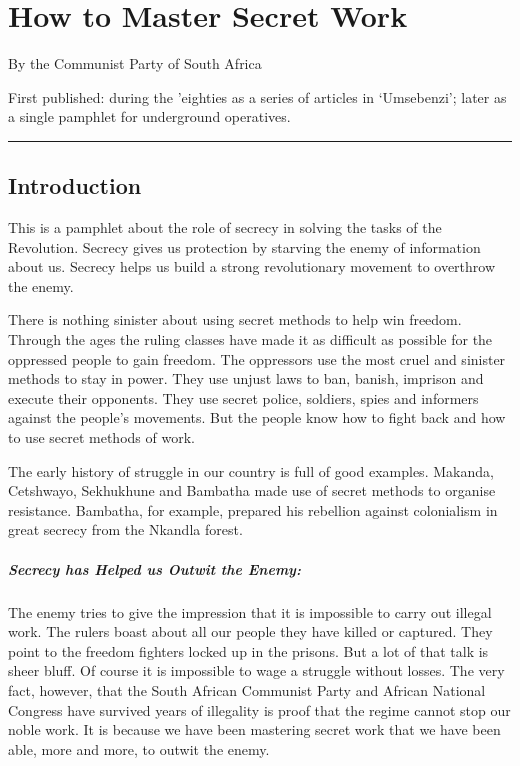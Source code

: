 
\chapter{How to Master Secret Work}

By the Communist Party of South Africa

{First published}: during the 'eighties as a series of articles in
`Umsebenzi'; later as a single pamphlet for underground operatives.

\begin{center}\rule{0.5\linewidth}{\linethickness}\end{center}

\section{Introduction}

This is a pamphlet about the role of secrecy in solving the tasks of the
Revolution. Secrecy gives us protection by starving the enemy of
information about us. Secrecy helps us build a strong revolutionary
movement to overthrow the enemy.

There is nothing sinister about using secret methods to help win
freedom. Through the ages the ruling classes have made it as difficult
as possible for the oppressed people to gain freedom. The oppressors use
the most cruel and sinister methods to stay in power. They use unjust
laws to ban, banish, imprison and execute their opponents. They use
secret police, soldiers, spies and informers against the people's
movements. But the people know how to fight back and how to use secret
methods of work.

The early history of struggle in our country is full of good examples.
Makanda, Cetshwayo, Sekhukhune and Bambatha made use of secret methods
to organise resistance. Bambatha, for example, prepared his rebellion
against colonialism in great secrecy from the Nkandla forest.

\paragraph{Secrecy has Helped us Outwit the Enemy:}

The enemy tries to give the impression that it is impossible to carry
out illegal work. The rulers boast about all our people they have killed
or captured. They point to the freedom fighters locked up in the
prisons. But a lot of that talk is sheer bluff. Of course it is
impossible to wage a struggle without losses. The very fact, however,
that the South African Communist Party and African National Congress
have survived years of illegality is proof that the regime cannot stop
our noble work. It is because we have been mastering secret work that we
have been able, more and more, to outwit the enemy.

